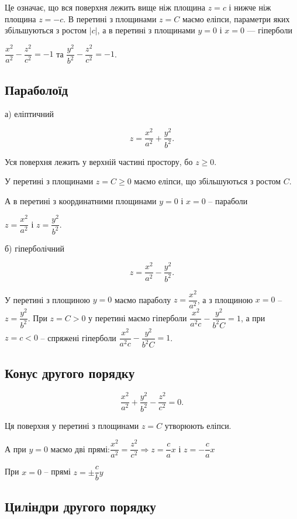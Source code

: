 Це означає, що вся поверхня лежить вище ніж площина $z = c$ і нижче
ніж площина $z = -c$. В перетині з площинами $z = C$ маємо еліпси, параметри 
яких збільшуються з ростом $|c|$, а в перетині з площинами $y = 0$ і $x = 0$ ---
гіперболи

$\dfrac{x^2}{a^2} - \dfrac{z^2}{c^2} = -1$ та $\dfrac{y^2}{b^2} - \dfrac{z^2}{c^2} = -1$.


\subsection{Параболоїд}

а) еліптичний

$$z = \dfrac{x^2}{a^2} + \dfrac{y^2}{b^2}.$$

Уся поверхня лежить у верхній частині простору, бо $z \geqslant 0$.

У перетині з площинами $z = C \geqslant 0$ маємо еліпси, що збільшуються з
ростом $C$.

А в перетині з координатними площинами $y = 0$ і $x = 0$ -- параболи

$z = \dfrac{x^2}{a^2}$ і $z = \dfrac{y^2}{b^2}$.



б) гіперболічний

$$z = \dfrac{x^2}{a^2} - \dfrac{y^2}{b^2}.$$

У перетині з площиною $y = 0$ маємо параболу $z = \dfrac{x^2}{a^2}$, а з площиною
$x = 0$ -- $z = \dfrac{y^2}{b^2}$. При $z = C > 0$ у перетині маємо гіперболи
$\dfrac{x^2}{a^2 c} - \dfrac{y^2}{b^2 C} = 1$, а при $z = c < 0$ -- спряжені гіперболи
$\dfrac{x^2}{a^2 c} - \dfrac{y^2}{b^2 C} = 1$.


\subsection{Конус другого порядку}

$$\dfrac{x^2}{a^2} + \dfrac{y^2}{b^2} - \dfrac{z^2}{c^2} = 0.$$

Ця поверхня у перетині з площинами $z = C$ утворюють еліпси.

А при $y = 0$ маємо дві прямі:$\dfrac{x^2}{a^2} = \dfrac{z^2}{c^2} \Rightarrow
z = \dfrac{c}{a}x$ і $z = - \dfrac{c}{a}x$

При $x = 0$ -- прямі $z = \pm \dfrac{c}{b}y$

\subsection{Циліндри другого порядку}

